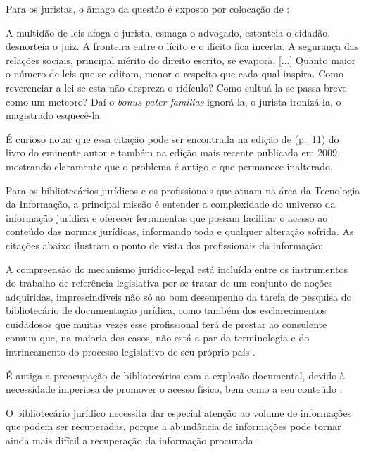 \documentclass[a4paper,11pt,openright,twoside,brazil]{abntex2}
\begin{document}
Para os juristas, o âmago da questão é exposto por colocação de
:

\begin{citacao}
A multidão de leis afoga o jurista, esmaga o advogado, estonteia o cidadão,
desnorteia o juiz. A fronteira entre o lícito e o ilícito fica incerta. A
segurança das relações sociais, principal mérito do direito escrito, se
evapora. [...] Quanto maior o número de leis que se editam, menor o respeito
que cada qual inspira. Como reverenciar a lei se esta não despreza o ridículo?
Como cultuá-la se passa breve como um meteoro? Daí o \emph{bonus pater familias}
ignorá-la, o jurista ironizá-la, o magistrado esquecê-la.
\end{citacao}

É curioso notar que essa citação pode ser encontrada na edição de
\citeyear{ferreira-filho1968} (p.~11) do livro do eminente autor e também na
edição mais recente publicada em 2009, mostrando claramente que o problema é
antigo e que permanece inalterado.

Para os bibliotecários jurídicos e os profissionais que atuam na área da
Tecnologia da Informação, a principal missão é entender a complexidade do
universo da informação jurídica e oferecer ferramentas que possam facilitar o
acesso ao conteúdo das normas jurídicas, informando toda e qualquer alteração
sofrida. As citações abaixo ilustram o ponto de vista dos profissionais da
informação:

\begin{citacao}
A compreensão do mecanismo jurídico-legal está incluída entre os instrumentos do
trabalho de referência legislativa por se tratar de um conjunto de noções
adquiridas, imprescindíveis não só ao bom desempenho da tarefa de pesquisa do
bibliotecário de documentação jurídica, como também dos esclarecimentos
cuidadosos que muitas vezes esse profissional terá de prestar ao consulente
comum que, na maioria dos casos, não está a par da terminologia e do
intrincamento do processo legislativo de seu próprio país
\cite[p.~20]{atienza1979}.
\end{citacao}

\begin{citacao}
É antiga a preocupação de bibliotecários com a explosão documental, devido à
necessidade imperiosa de promover o acesso físico, bem como a seu conteúdo
\cite[p.~364]{passos1994}.
\end{citacao}

\begin{citacao}
O bibliotecário jurídico necessita dar especial atenção ao volume de informações
que podem ser recuperadas, porque a abundância de informações pode tornar ainda
mais difícil a recuperação da informação procurada \cite[p.~96]{passos2009}.
\end{citacao}
\end{document}
